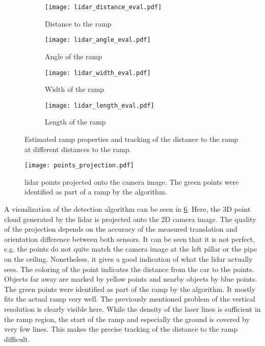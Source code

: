 \begin{figure}[htbp]
    \centering
    \begin{subfigure}{1\textwidth}
        \centering
        \texttt{[image: lidar\_distance\_eval.pdf]}
        \caption{Distance to the ramp}
        \label{fig:lidar_distance_eval}
    \end{subfigure}
    
    \begin{subfigure}{1\textwidth}
        \centering
        \texttt{[image: lidar\_angle\_eval.pdf]}
        \caption{Angle of the ramp}
        \label{fig:lidar_angle_eval}
    \end{subfigure}
    
    \begin{subfigure}{1\textwidth}
        \centering
        \texttt{[image: lidar\_width\_eval.pdf]}
        \caption{Width of the ramp}
        \label{fig:lidar_width_eval}
    \end{subfigure}
    
    \begin{subfigure}{1\textwidth}
        \centering
        \texttt{[image: lidar\_length\_eval.pdf]}
        \caption{Length of the ramp}
        \label{fig:lidar_length_eval}
    \end{subfigure}
    \caption[ estimation of ramp properties at different distances]{Estimated ramp properties and tracking of the distance to the ramp at different distances to the ramp.}
    \label{fig:lidar_eval}
\end{figure}
\begin{figure}[htbp]
    \centering
    \texttt{[image: points\_projection.pdf]}
    \caption[2D visualization of the  point cloud]{\acrshort{lidar} points projected onto the camera image. The green points were identified as part of a ramp by the algorithm.}
    \label{fig:points_projection}
\end{figure}
A visualization of the detection algorithm can be seen in \cref{fig:points_projection}.
Here, the 3D point cloud generated by the \gls{lidar} is projected onto the 2D camera image.
The quality of the projection depends on the accuracy of the measured translation and orientation difference between both sensors.
It can be seen that it is not perfect, e.g. the points do not quite match the camera image at the left pillar or the pipe on the ceiling.
Nonetheless, it gives a good indication of what the \gls{lidar} actually sees.
The coloring of the point indicates the distance from the car to the points.
Objects far away are marked by yellow points and nearby objects by blue points.
The green points were identified as part of the ramp by the algorithm.
It mostly fits the actual ramp very well.
The previously mentioned problem of the vertical resolution is clearly visible here.
While the density of the laser lines is sufficient in the ramp region, the start of the ramp and especially the ground is covered by very few lines.
This makes the precise tracking of the distance to the ramp difficult.



